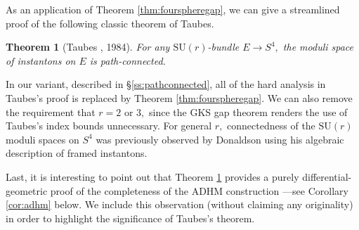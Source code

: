 \documentclass[12pt]{amsart}
\renewcommand{\1}{{\mathbf 1}}
\newcommand{\SU}{{\mathrm{SU} }}
\newtheorem{thm}{Theorem}[section]
\theoremstyle{others}
\numberwithin{equation}{section}
\begin{document}
As an application of Theorem \ref{thm:fourspheregap}, we can give a streamlined proof of the following classic theorem of Taubes.
\begin{thm}[Taubes \cite{taubespathconnected}, 1984]\label{thm:pathconnected}
For any $\SU(r)$-bundle $E \to S^4,$ the moduli space of instantons on $E$ is path-connected.
\end{thm}
\noindent In our variant, described in \S \ref{ss:pathconnected}, all of the hard analysis in Taubes's proof is replaced by Theorem \ref{thm:fourspheregap}. %
We can also remove the requirement that $r = 2$ or $3,$ since the GKS gap theorem \cite{gurskykelleherstreets} renders the use of Taubes's index bounds \cite{taubesstability} unnecessary. For general $r,$ connectedness of the $\SU(r)$ moduli spaces on $S^4$ was previously observed by Donaldson \cite[p. 454]{donaldsoninstantonsandgit} using his algebraic description of framed instantons.

Last, it is interesting to point out that Theorem \ref{thm:pathconnected} provides a purely differential-geometric proof of the completeness of the ADHM construction \cite{adhm}%
---see Corollary \ref{cor:adhm} below. We include this observation (without claiming any originality)
in order to highlight the significance of Taubes's theorem. %







\end{document}
